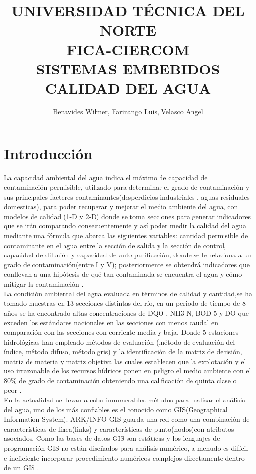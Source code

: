 \documentclass[10pt,a4paper]{article}
\begin{document}
\author{Benavides Wilmer, Farinango Luis, Velasco Angel}
\title{UNIVERSIDAD TÉCNICA DEL NORTE \\
FICA-CIERCOM\\
SISTEMAS EMBEBIDOS\\
CALIDAD DEL AGUA }
\maketitle
\section{Introducción}
\begin{multicols}{2}
La capacidad ambiental del agua indica el máximo de capacidad de contaminación permisible, utilizado para determinar el grado de contaminación y sus principales factores contaminantes(desperdicios industriales , aguas residuales domesticas), para poder recuperar y mejorar el medio ambiente del agua, con modelos de calidad (1-D y 2-D) donde se toma secciones para generar indicadores que se irán comparando consecuentemente y así poder medir la calidad del agua mediante una fórmula que abarca las siguientes variables: cantidad permisible de contaminante en el agua entre la sección de salida y la sección de control, capacidad de dilución y capacidad de auto purificación, donde se le relaciona a un grado de contaminación(entre I y V); posteriormente se obtendrá indicadores que conllevan a una hipótesis de qué tan contaminada se encuentra el agua y cómo mitigar la contaminación \cite{zhang2011study}.\\
La condición ambiental del agua evaluada en términos de calidad y cantidad,se ha  tomado muestras en 13 secciones distintas del río, en un periodo de tiempo de 8 años se ha encontrado altas concentraciones de DQO , NH3-N, BOD 5 y DO que exceden los estándares nacionales en las secciones con menos caudal en comparación con las secciones con corriente media y baja. Donde 5 estaciones hidrológicas han empleado métodos de evaluación (método de evaluación del índice, método difuso, método gris) y la identificación de la matriz de decisión, matriz de materia y matriz objetiva las cuales establecen que la explotación y el uso irrazonable de los recursos hídricos ponen en peligro el medio ambiente con el 80\% de grado de contaminación obteniendo una calificación de quinta clase o peor \cite{guo2011integrated}.\\
En la actualidad se llevan a cabo innumerables métodos para realizar el análisis del agua, uno de los más confiables es el conocido como GIS(Geographical Information System). ARK/INFO GIS guarda una red como una combinación de características de línea(links) y características de punto(nodos)con atributos asociados. Como las bases de datos GIS son estáticas y los lenguajes de programación GIS no están diseñados para análisis numérico, a menudo es difícil e ineficiente incorporar procedimiento numéricos complejos directamente dentro de un GIS \cite{jiang2011application}.\\

\end{multicols}
\end{document}
